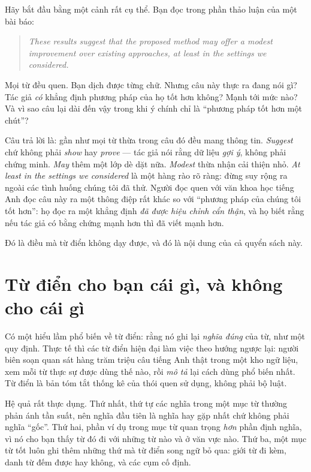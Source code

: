 \documentclass[../../english.tex]{subfiles}
\begin{document}
Hãy bắt đầu bằng một cảnh rất cụ thể. Bạn đọc trong phần thảo luận của một bài báo:

\begin{quote}
\emph{These results suggest that the proposed method may offer a modest improvement over existing approaches, at least in the settings we considered.}
\end{quote}

Mọi từ đều quen. Bạn dịch được từng chữ. Nhưng câu này thực ra đang nói gì? Tác giả \emph{có} khẳng định phương pháp của họ tốt hơn không? Mạnh tới mức nào? Và vì sao câu lại dài đến vậy trong khi ý chính chỉ là ``phương pháp tốt hơn một chút''?

Câu trả lời là: gần như mọi từ thừa trong câu đó đều mang thông tin. \emph{Suggest} chứ không phải \emph{show} hay \emph{prove} --- tác giả nói rằng dữ liệu \emph{gợi ý}, không phải chứng minh. \emph{May} thêm một lớp dè dặt nữa. \emph{Modest} thừa nhận cải thiện nhỏ. \emph{At least in the settings we considered} là một hàng rào rõ ràng: đừng suy rộng ra ngoài các tình huống chúng tôi đã thử. Người đọc quen với văn khoa học tiếng Anh đọc câu này ra một thông điệp rất khác so với ``phương pháp của chúng tôi tốt hơn'': họ đọc ra một khẳng định \emph{đã được hiệu chỉnh cẩn thận}, và họ biết rằng nếu tác giả có bằng chứng mạnh hơn thì đã viết mạnh hơn.

Đó là điều mà từ điển không dạy được, và đó là nội dung của cả quyển sách này.

\section{Từ điển cho bạn cái gì, và không cho cái gì}

Có một hiểu lầm phổ biến về từ điển: rằng nó ghi lại \emph{nghĩa đúng} của từ, như một quy định. Thực tế thì các từ điển hiện đại làm việc theo hướng ngược lại: người biên soạn quan sát hàng trăm triệu câu tiếng Anh thật trong một kho ngữ liệu, xem mỗi từ thực sự được dùng thế nào, rồi \emph{mô tả} lại cách dùng phổ biến nhất. Từ điển là bản tóm tắt thống kê của thói quen sử dụng, không phải bộ luật.

Hệ quả rất thực dụng. Thứ nhất, thứ tự các nghĩa trong một mục từ thường phản ánh tần suất, nên nghĩa đầu tiên là nghĩa hay gặp nhất chứ không phải nghĩa ``gốc''. Thứ hai, phần ví dụ trong mục từ quan trọng \emph{hơn} phần định nghĩa, vì nó cho bạn thấy từ đó đi với những từ nào và ở văn vực nào. Thứ ba, một mục từ tốt luôn ghi thêm những thứ mà từ điển song ngữ bỏ qua: giới từ đi kèm, danh từ đếm được hay không, và các cụm cố định.
\end{document}
